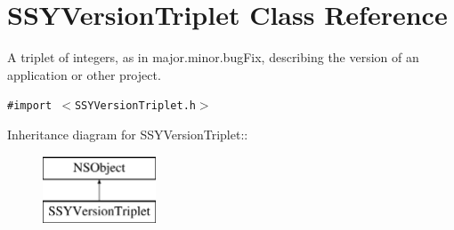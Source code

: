 \hypertarget{interface_s_s_y_version_triplet}{
\section{SSYVersionTriplet Class Reference}
\label{interface_s_s_y_version_triplet}
}
A triplet of integers, as in major.minor.bugFix, describing the version of an application or other project.  


{\tt \#import $<$SSYVersionTriplet.h$>$}

Inheritance diagram for SSYVersionTriplet::\begin{figure}[H]
\begin{center}
\leavevmode
\includegraphics[height=2cm]{interface_s_s_y_version_triplet}
\end{center}
\end{figure}
